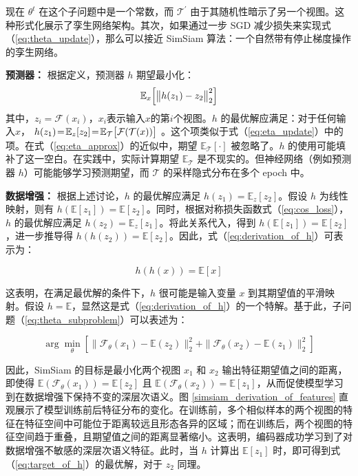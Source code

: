 \documentclass[master]{thesis-uestc}
\begin{document}
现在 $\theta^{t}$ 在这个子问题中是一个常数，而 $\mathcal{T}^{\prime}$ 由于其随机性暗示了另一个视图。这种形式化展示了孪生网络架构。其次，如果通过一步 SGD 减少损失来实现式（\ref{eq:theta_update}），那么可以接近 SimSiam 算法：一个自然带有停止梯度操作的孪生网络。

\textbf{预测器：} 根据定义，预测器 $h$ 期望最小化：
\begin{equation}
\mathbb{E}_{x}\Big{[}\big{\|}h(z_{1})-z_{2}\big{\|}_{2}^{2}\Big{]} 
\label{eq:target_of_h}
\end{equation}
其中，$z_i = \mathcal{F}(x_i)$，$x_i$表示输入$x$的第$i$个视图。$h$ 的最优解应满足：对于任何输入$x$， $h(z_{1})\!=\!\mathbb{E}_{z}[z_{2}]\!=\!\mathbb{E}_{\mathcal{T}}\big{[}\mathcal{F}( \mathcal{T}(x))\big{]}$ 。这个项类似于式（\ref{eq:eta_update}）中的项。在式（\ref{eq:eta_approx}）的近似中，期望 $\mathbb{E}_{\mathcal{T}}[\cdot]$ 被忽略了。$h$ 的使用可能填补了这一空白。在实践中，实际计算期望 $\mathbb{E}_{\mathcal{T}}$ 是不现实的。但神经网络（例如预测器 $h$）可能能够学习预测期望，而 $\mathcal{T}$ 的采样隐式分布在多个 epoch 中。

\textbf{数据增强：} 根据上述讨论，$h$ 的最优解应满足 $h(z_1) = \mathbb{E}_z[z_2]$。假设 $h$ 为线性映射，则有 $h(\mathbb{E}[z_1]) = \mathbb{E}[z_2]$。同时，根据对称损失函数式（\ref{eq:cos_loss}），$h$ 的最优解应满足 $h(z_2) = \mathbb{E}_z[z_1]$。将此关系代入，得到 $h(\mathbb{E}[z_1]) = \mathbb{E}[z_2]$，进一步推导得 $h(h(z_2)) = \mathbb{E}[z_2]$。因此，式（\ref{eq:derivation_of_h}）可表示为：

\begin{equation}
    h(h(x)) = \mathbb{E}[x]
    \label{eq:derivation_of_h}
\end{equation}

这表明，在满足最优解的条件下，$h$ 很可能是输入变量 $x$ 到其期望值的平滑映射。假设 $h = \mathbb{E}$，显然这是式（\ref{eq:derivation_of_h}）的一个特解。基于此，子问题（\ref{eq:theta_subproblem}）可以表述为：

\begin{equation}
    \arg\min_{\theta} \left[\| \mathcal{F}_{\theta}(x_1) - \mathbb{E}(z_2) \|_2^2 + \| \mathcal{F}_{\theta}(x_2) - \mathbb{E}(z_1) \|_2^2 \right]
\end{equation}

因此，SimSiam 的目标是最小化两个视图 \( x_1 \) 和 \( x_2 \) 输出特征期望值之间的距离，即使得 \( \mathbb{E}(\mathcal{F}_\theta(x_1)) = \mathbb{E}[z_2] \) 且 \( \mathbb{E}(\mathcal{F}_\theta(x_2)) = \mathbb{E}[z_1] \)，从而促使模型学习到在数据增强下保持不变的深层次语义。图 \ref{simsiam_derivation_of_features} 直观展示了模型训练前后特征分布的变化。在训练前，多个相似样本的两个视图的特征在特征空间中可能位于距离较远且形态各异的区域；而在训练后，两个视图的特征空间趋于重叠，且期望值之间的距离显著缩小。这表明，编码器成功学习到了对数据增强不敏感的深层次语义特征。此时，当 \( h \) 计算出 \( \mathbb{E}[z_1] \) 时，即可得到式（\ref{eq:target_of_h}）的最优解，对于 \( z_2 \) 同理。
\end{document}
